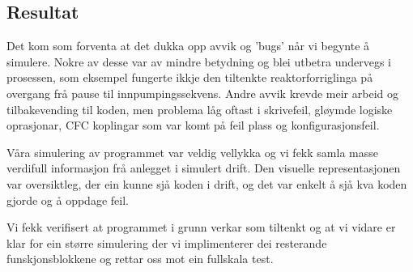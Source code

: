 \newpage

\subsection{Resultat}

Det kom som forventa at det dukka opp avvik og 'bugs' når vi begynte å simulere.
Nokre av desse var av mindre betydning og blei utbetra undervegs i prosessen, som eksempel fungerte ikkje den tiltenkte
reaktorforriglinga på overgang frå pause til innpumpingssekvens. \newline
Andre avvik krevde meir arbeid og tilbakevending til koden, men problema låg oftast i skrivefeil, gløymde logiske oprasjonar,
CFC koplingar som var komt på feil plass og konfigurasjonsfeil.

Våra simulering av programmet var veldig vellykka og vi fekk samla masse verdifull informasjon frå anlegget i simulert drift. 
Den visuelle representasjonen var oversiktleg, der ein kunne sjå koden i drift, og det var enkelt å sjå kva koden gjorde og å oppdage feil. 

Vi fekk verifisert at programmet i grunn verkar som tiltenkt og at vi vidare er klar for ein større simulering 
der vi implimenterer dei resterande funskjonsblokkene og rettar oss mot ein fullskala test.


